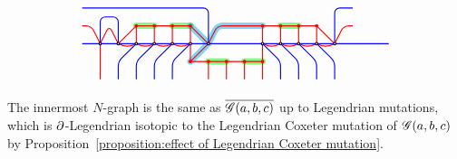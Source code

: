 \[\begin{tikzcd}
\begin{tikzpicture}[baseline=-.5ex,scale=1]
\begin{scope}
\draw[color=cyclecolor2, line cap=round, line width=5, opacity=0.5] (-3,0) -- (-2.5,0) (-2, 0) -- (-1.5, 0) (-1, -1) -- (-0.5, -1) (0,-1) -- (0.5,-1) (1, 0) -- (1.5, 0);
\draw[color=cyan, rounded corners, line cap=round, line width=5, opacity=0.5] 
(-1.5, -1) -- (-1, -0.5) -- (-0.75, 0) -- (0.5, 0)
(-1.5,0) -- (-1, -0.5);
%
\draw[thick, blue, rounded corners] 
(-4.5,-0.5) -- (4, -0.5)
(-4.5, 0.5) -- (-1, 0.5) -- (-1, -0.5)
(2.5, -0.5) -- (2.5, 0.5) -- (3,0.5)
(-4, -0.5) -- (-4, 0.25) -- (-3.5, 0.25) -- (-3.5, -0.5)
;
%
\draw[thick, blue, rounded corners] 
(-3.5, -1.5) -- (-3.5, -1) -- (-3, -0.5)
(-3, -1.5) -- (-3, -1) -- (-2.5, -0.5)
(-2.5, -1.5) -- (-2.5, -1) -- (-2, -0.5)
(-2, -1.5) -- (-2, -1) -- (-1.5, -0.5)
(1, -1.5) -- (1, -1) -- (0.5, -0.5)
(1.5, -1.5) -- (1.5, -1) -- (1, -0.5)
(2, -1.5) -- (2, -1) -- (1.5, -0.5)
(2.5, -1.5) -- (2.5, -1) -- (2,-0.5);
%
\draw[thick, red, fill] 
(-4,-1.5) -- (-4,-0.5) 
(-1.5, -0.5) -- (-1.5, -1) circle (1pt) -- (-1, -1)
(-1, -0.5) -- (-1.5, -1)
(-1, -1.5) -- (-1, -1) circle (1pt)
(-0.5,-1.5) -- (-0.5, -1) circle (1pt) -- (-1, -1) (-0.5, -1) -- (0, -1)
(0, -1.5) -- (0,-1) circle (1pt)
(0.5, -1.5) -- (0.5,-1) circle (1pt) -- (0.5, -0.5) (0.5, -1) -- (0, -1)
(0.5, -0.5) -- (0.5, 0) circle (1pt)
(1, -0.5) -- (1, 0) circle (1pt)
(1.5, -0.5) -- (1.5, 0) circle (1pt)
(2, -0.5) -- (2, 0) circle (1pt)
(2.5, -0.5) -- (2, 0)
(-3.5, -0.5) -- (-3, 0) (-3, 0) -- (-1.5,0)
(-3, -0.5) -- (-3, 0) circle (1pt)
(-2.5, -0.5) -- (-2.5, 0) circle (1pt)
(-2, -0.5) -- (-2, 0) circle (1pt)
(-1.5, -0.5) -- (-1.5, 0) circle (1pt)
;
\draw[thick, red, rounded corners] (-4.5,0) -- (-4.25,0) -- (-4,-0.5) (-4, -0.5) -- (-3.75, 0) -- (-3.5, -0.5) 
(-1, -0.5) -- (-0.75, 0) -- (2, 0)
(2.5, -0.5) -- (2.75, 0) -- (3,0)
(0.5, -0.5) to[out=-30, in=-150] (1, -0.5)
(1, -0.5) to[out=-30, in=-150] (1.5, -0.5)
(1.5, -0.5) to[out=-30, in=-150] (2, -0.5)
(2, -0.5) to[out=-30, in=-150] (2.5, -0.5)
(-1.5, 0) -- (-1, -0.5)
(-3.5, -0.5) to[out=-30, in=-150] (-3, -0.5)
(-3, -0.5) to[out=-30, in=-150] (-2.5, -0.5)
(-2.5, -0.5) to[out=-30, in=-150] (-2, -0.5)
(-2, -0.5) to[out=-30, in=-150] (-1.5, -0.5)
;
%
\foreach \x in {-4, -3.5, -3, -2.5, -2, -1.5, -1, 0.5, 1, 1.5, 2, 2.5} {
\draw[thick, fill=white] (\x,-0.5) circle (1pt) ;
}
\end{scope}
\end{tikzpicture}
\end{tikzcd}
\]

The innermost $N$-graph is the same as $\overline{\mathscr{G}(a,b,c)}$ up to Legendrian mutations, which is $\partial$-Legendrian isotopic to the Legendrian Coxeter mutation of $\mathscr{G}(a,b,c)$ by Proposition~\ref{proposition:effect of Legendrian Coxeter mutation}.


